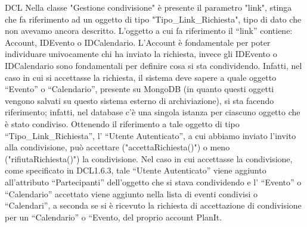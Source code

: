 \begin{listaPersonale}{DCL}
    Nella classe "Gestione condivisione" è presente il parametro "link", stinga che fa riferimento ad un oggetto di tipo "Tipo\_Link\_Richiesta", tipo di dato che non avevamo ancora descritto.
    L’oggetto a cui fa riferimento il “link” contiene: Account, IDEvento o IDCalendario. L’Account è fondamentale per poter individuare univocamente chi ha inviato la richiesta, invece gli IDEvento o IDCalendario sono fondamentali per definire cosa si sta condividendo. Infatti, nel caso in cui si accettasse la richiesta, il sistema deve sapere a quale oggetto “Evento” o “Calendario”, presente su MongoDB (in quanto questi oggetti vengono salvati su questo sistema esterno di archiviazione), si sta facendo riferimento; infatti, nel database c’è una singola istanza per ciascuno oggetto che è stato condiviso.
    Ottenendo il riferimento a tale oggetto di tipo “Tipo\_Link\_Richiesta”, l’ “Utente Autenticato”, a cui abbiamo inviato l’invito alla condivisione, può accettare ("accettaRichiesta()") o meno ("rifiutaRichiesta()") la condivisione. Nel caso in cui accettasse la condivisione, come specificato in DCL1.6.3, tale “Utente Autenticato” viene aggiunto all’attributo “Partecipanti” dell’oggetto che si stava condividendo e l’ “Evento” o “Calendario” accettato viene aggiunto nella lista di eventi condivisi o “Calendari”, a seconda se si è ricevuto la richiesta di accettazione di condivisione per un “Calendario” o “Evento, del proprio account PlanIt.
    \begin{comment}
        \begin{center}
            \\
            \blfootnote{Immagine \href{https://github.com/Life-planner/Documentazione/blob/main/D3/img/Diagrammi/png/path/to/img.png}{PNG}/\href{https://github.com/Life-planner/Documentazione/blob/main/D3/img/Diagrammi/svg/path/to/img.svg}{SVG} nome file}
        \end{center}
    \end{comment}


\end{listaPersonale}
